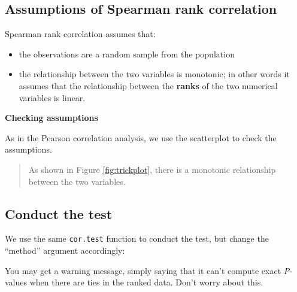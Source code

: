 \documentclass[
]{book}
\newenvironment{Shaded}{\begin{snugshade}}{\end{snugshade}}
\newcommand{\AttributeTok}[1]{\textcolor[rgb]{0.13,0.29,0.53}{#1}}
\newcommand{\FloatTok}[1]{\textcolor[rgb]{0.00,0.00,0.81}{#1}}
\newcommand{\FunctionTok}[1]{\textcolor[rgb]{0.13,0.29,0.53}{\textbf{#1}}}
\newcommand{\NormalTok}[1]{#1}
\newcommand{\OtherTok}[1]{\textcolor[rgb]{0.56,0.35,0.01}{#1}}
\newcommand{\SpecialCharTok}[1]{\textcolor[rgb]{0.81,0.36,0.00}{\textbf{#1}}}
\newcommand{\StringTok}[1]{\textcolor[rgb]{0.31,0.60,0.02}{#1}}
\providecommand{\tightlist}{%
  \setlength{\itemsep}{0pt}\setlength{\parskip}{0pt}}
\begin{document}
\subsection{Assumptions of Spearman rank correlation}\label{assum_spear}

Spearman rank correlation assumes that:

\begin{itemize}
\tightlist
\item
  the observations are a random sample from the population\\
\item
  the relationship between the two variables is monotonic; in other words it assumes that the relationship between the \textbf{ranks} of the two numerical variables is linear.
\end{itemize}

\textbf{Checking assumptions}

As in the Pearson correlation analysis, we use the scatterplot to check the assumptions.

\begin{quote}
As shown in Figure \ref{fig:trickplot}, there is a monotonic relationship between the two variables.
\end{quote}

\subsection{Conduct the test}\label{conduct_spearman}

We use the same \texttt{cor.test} function to conduct the test, but change the ``method'' argument accordingly:

\begin{Shaded}
\end{Shaded}

You may get a warning message, simply saying that it can't compute exact \emph{P}-values when there are ties in the ranked data. Don't worry about this.
\end{document}
